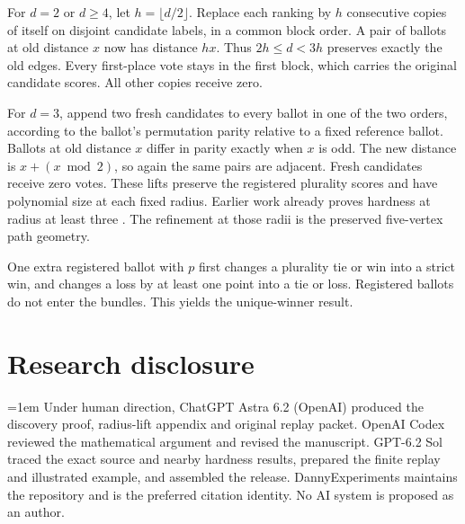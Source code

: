 \documentclass[11pt,a4paper]{amsart}
\begin{document}
For \(d=2\) or \(d\ge4\), let \(h=\lfloor d/2\rfloor\). Replace each ranking by \(h\) consecutive copies of itself on disjoint candidate labels, in a common block order. A pair of ballots at old distance \(x\) now has distance \(hx\). Thus \(2h\le d<3h\) preserves exactly the old edges. Every first-place vote stays in the first block, which carries the original candidate scores. All other copies receive zero.

For \(d=3\), append two fresh candidates to every ballot in one of the two orders, according to the ballot's permutation parity relative to a fixed reference ballot. Ballots at old distance \(x\) differ in parity exactly when \(x\) is odd. The new distance is \(x+(x\bmod 2)\), so again the same pairs are adjacent. Fresh candidates receive zero votes. These lifts preserve the registered plurality scores and have polynomial size at each fixed radius. Earlier work already proves hardness at radius at least three \cite[Thm.~6.21]{chen}\cite[Thm.~7]{bcfnt}. The refinement at those radii is the preserved five-vertex path geometry.

One extra registered ballot with \(p\) first changes a plurality tie or win into a strict win, and changes a loss by at least one point into a tie or loss. Registered ballots do not enter the bundles. This yields the unique-winner result.

\section*{Research disclosure}

\begingroup{}\emergencystretch=1em\relax
Under human direction, ChatGPT Astra 6.2 (OpenAI) produced the discovery proof, radius-lift appendix and original replay packet. OpenAI Codex reviewed the mathematical argument and revised the manuscript. GPT-6.2 Sol traced the exact source and nearby hardness results, prepared the finite replay and illustrated example, and assembled the release. DannyExperiments maintains the repository and is the preferred citation identity. No AI system is proposed as an author.
\par\endgroup
\end{document}

